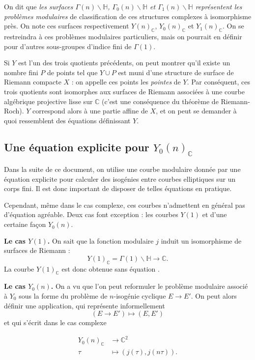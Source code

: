 \documentclass[11pt,a4paper]{article}
\newcommand{\C}{\mathbb{C}}
\renewcommand{\H}{\mathbb{H}}
\renewcommand{\b}{\backslash}
\newcommand{\vers}{\longrightarrow}
\theoremstyle{definition}
\begin{document}
On dit que \emph{les surfaces $\Gamma(n)\b \H$, $\Gamma_0(n)\b \H$ et $\Gamma_1(n)\b \H$ représentent les problèmes modulaires} de classification de ces structures complexes à isomorphisme près. On note ces surfaces respectivement $Y(n)_\C$, $Y_0(n)_\C$ et $Y_1(n)_\C$. On se restreindra à ces problèmes modulaires particuliers, mais on pourrait en définir pour d'autres sous-groupes d'indice fini de $\Gamma(1)$.

Si $Y$ est l'un des trois quotients précédents, on peut montrer qu'il existe un nombre fini $P$ de points tel que $Y\cup P$ est muni d'une structure de surface de Riemann compacte $X$ : on appelle ces points les \emph{pointes} de $Y$. Par conséquent, ces trois quotients sont isomorphes aux surfaces de Riemann associées à une courbe algébrique projective lisse sur $\C$ (c'est une conséquence du théorème de Riemann-Roch). $Y$ correspond alors à une partie affine de $X$, et on peut se demander à quoi ressemblent des équations définissant $Y$.


\subsection{Une équation explicite pour $Y_0(n)_\C$}


Dans la suite de ce document, on utilise une courbe modulaire donnée par une équation explicite pour calculer des isogénies entre courbes elliptiques sur un corps fini. Il est donc important de disposer de telles équations en pratique.

Cependant, même dans le cas complexe, ces courbes n'admettent en général pas d'équation agréable. Deux cas font exception : les courbes $Y(1)$ et d'une certaine façon $Y_0(n)$.

\textbf{Le cas $Y(1)$.} On sait que la fonction modulaire $j$ induit un isomorphisme de surfaces de Riemann :
$$Y(1)_\C = \Gamma(1)\b \H \vers \C.$$
La courbe $Y(1)_\C$ est donc obtenue \og sans équation \fg.

\textbf{Le cas $Y_0(n)$.} On a vu que l'on peut reformuler le problème modulaire associé à $Y_0$ sous la forme du problème de $n$-isogénie cyclique $E\vers E'$. On peut alors définir une application, qui représente informellement
$$(E\vers E') \longmapsto (E, E')$$
et qui s'écrit dans le cas complexe

$$\begin{aligned}
Y_0(n)_\C &\vers \C^2 \\
 \tau &\longmapsto (j(\tau), j(n\tau)).
\end{aligned}$$
\end{document}
